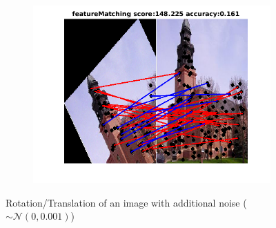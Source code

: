 \documentclass[
	fontsize=12pt,
	paper=a4,
	twoside=false,
	numbers=noenddot,
	plainheadsepline,
	toc=listof,
	toc=bibliography
]{scrartcl}
\begin{document}
\begin{figure}[h]
\begin{subfigure}[b]{0.3\textwidth}
		\includegraphics[scale=0.4]{"fig_ver2608/RealImages/Img_trafo/no_descr/using_cdf_afftrafo/fi_5_featM"} 
	\end{subfigure} 	
	\caption{Rotation/Translation of an image with additional noise ($\sim\mathcal{N}(0,0.001)$)}
\end{figure}

\FloatBarrier
\end{document}

